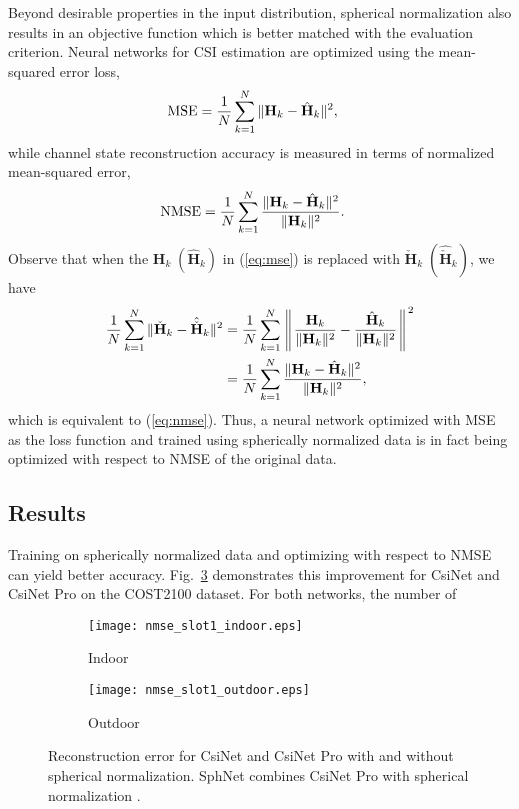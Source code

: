 Beyond desirable properties in the input distribution, spherical normalization also results in an objective function which is better matched with the evaluation criterion. Neural networks for CSI estimation are optimized using the mean-squared error loss,
\begin{align} 
	\text{MSE}&=\frac 1N \sum_{k=1}^N\Arrowvert\mathbf H_k - \hat{\mathbf H}_k\Arrowvert^2, \label{eq:mse}
\end{align}
while channel state reconstruction accuracy is measured in terms of normalized mean-squared error,
\begin{align} 
	\text{NMSE}&=\frac 1N \sum_{k=1}^N\frac{\Arrowvert\mathbf H_k - \hat{\mathbf H}_k\Arrowvert^2}{\Arrowvert\mathbf H_k\Arrowvert^2}. \label{eq:nmse}
\end{align}
Observe that when the $\mathbf H_k \; (\hat{\mathbf H}_k)$ in (\ref{eq:mse}) is replaced with $\check{\mathbf H}_k \; (\hat{\check{\mathbf H}}_k)$, we have
\begin{align*} 
	\frac 1N \sum_{k=1}^N\Arrowvert\check{\mathbf H}_k - \hat{\check{\mathbf H}}_k\Arrowvert^2&= \frac 1N \sum_{k=1}^N\left\Arrowvert \frac{\mathbf H_k}{\Arrowvert\mathbf H_k\Arrowvert^2} - \frac{\hat{\mathbf H}_k}{\Arrowvert\mathbf H_k\Arrowvert^2}\right\Arrowvert^2 \\
	&= \frac 1N \sum_{k=1}^N\frac{\Arrowvert\mathbf H_k - \hat{\mathbf H}_k\Arrowvert^2}{\Arrowvert\mathbf H_k\Arrowvert^2},
\end{align*}
which is equivalent to (\ref{eq:nmse}). Thus, a neural network optimized with MSE as the loss function and trained using spherically normalized data is in fact being optimized with respect to NMSE of the original data.

\subsection{Results}
Training on spherically normalized data and optimizing with respect to NMSE can yield better accuracy. Fig.~\ref{fig:nmse_slot1} demonstrates this improvement for CsiNet and CsiNet Pro on the COST2100 dataset. For both networks, the number of 

\begin{figure}[!hbtp] \centering 
	\begin{subfigure}[t]{.45\textwidth}
		\centering
		\texttt{[image: nmse\_slot1\_indoor.eps]}
		\caption{Indoor}
		\label{fig:slot1_indoor} 
	\end{subfigure}
	\begin{subfigure}[t]{.45\textwidth}
		\centering
		\texttt{[image: nmse\_slot1\_outdoor.eps]}
		\caption{Outdoor}
		\label{fig:slot1_outdoor} 
	\end{subfigure}
	\caption{Reconstruction error for CsiNet \cite{ref:csinet} and CsiNet Pro with and without spherical normalization. SphNet combines CsiNet Pro with spherical normalization \cite{ref:liu2020sphnet}.}
	\label{fig:nmse_slot1} 
\end{figure}
